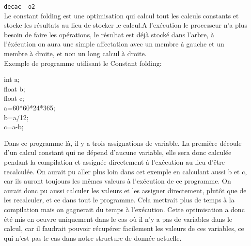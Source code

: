 \documentclass[a4paper]{article}
\begin{document}
\begin{itemize}
\texttt{decac -o2}\\
Le constant folding est une optimisation qui calcul tout les calculs constants et stocke les résultats au lieu de stocker le calcul.A l'exécution le processeur n'a plus besoin de faire les opérations, le résultat est déjà stocké dans l'arbre, à l'éxécution on aura une simple affectation avec un membre à gauche et un membre à droite, et non un long calcul à droite.\\
Exemple de programme utilisant le Constant folding:
\begin{center}
int a;\\
float b;\\
float c;\\
a=60*60*24*365;\\
b=a/12;\\
c=a-b;\\
\end{center}
Dans ce programme là, il y a trois assignations de variable. La première découle d'un calcul constant qui ne dépend d'aucune variable, elle sera donc calculée pendant la compilation et assignée directement à l'exécution au lieu d'être recalculée. On aurait pu aller plus loin dans cet exemple en calculant aussi b et c, car ils auront toujours les mêmes valeurs à l'exécution de ce programme. On aurait donc pu aussi calculer les valeurs et les assigner directement, plutôt que de les recalculer, et ce dans tout le programme. Cela mettrait plus de temps à la compilation mais on gagnerait du temps à l'exécution. Cette optimisation a donc été mis en oeuvre uniquement dans le cas où il n'y a pas de variables dans le calcul, car il faudrait pouvoir récupérer facilement les valeurs de ces variables, ce qui n'est pas le cas dans notre structure de donnée actuelle.
     \end{itemize}
\end{document}
